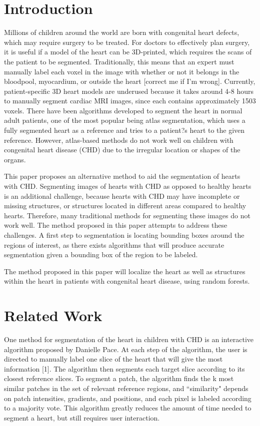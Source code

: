 \section{Introduction}
Millions of children around the world are born with congenital heart defects, which may require surgery to be treated. For doctors to effectively plan surgery, it is useful if a model of the heart can be 3D-printed, which requires the scans of the patient to be segmented. Traditionally, this means that an expert must manually label each voxel in the image with whether or not it belongs in the bloodpool, myocardium, or outside the heart [correct me if I'm wrong]. Currently, patient-specific 3D heart models are underused because it takes around 4-8 hours to manually segment cardiac MRI images, since each contains approximately 1503 voxels. There have been algorithms developed to segment the heart in normal adult patients, one of the most popular being atlas segmentation, which uses a fully segmented heart as a reference and tries to a patient?s heart to the given reference. However, atlas-based methods do not work well on children with congenital heart disease (CHD) due to the irregular location or shapes of the organs.

This paper proposes an alternative method to aid the segmentation of hearts with CHD. Segmenting images of hearts with CHD as opposed to healthy hearts is an additional challenge, because hearts with CHD may have incomplete or missing structures, or structures located in different areas compared to healthy hearts. Therefore, many traditional methods for segmenting these images do not work well. The method proposed in this paper attempts to address these challenges. A first step to segmentation is locating bounding boxes around the regions of interest, as there exists algorithms that will produce accurate segmentation given a bounding box of the region to be labeled.

The method proposed in this paper will localize the heart as well as structures within the heart in patients with congenital heart disease, using random forests.

\section{Related Work}
One method for segmentation of the heart in children with CHD is an interactive algorithm proposed by Danielle Pace. At each step of the algorithm, the user is directed to manually label one slice of the heart that will give the most information [1]. The algorithm then segments each target slice according to its closest reference slices. To segment a patch, the algorithm finds the k most similar patches in the set of relevant reference regions, and ``similarity" depends on patch intensities, gradients, and positions, and each pixel is labeled according to a majority vote. This algorithm greatly reduces the amount of time needed to segment a heart, but still requires user interaction.

